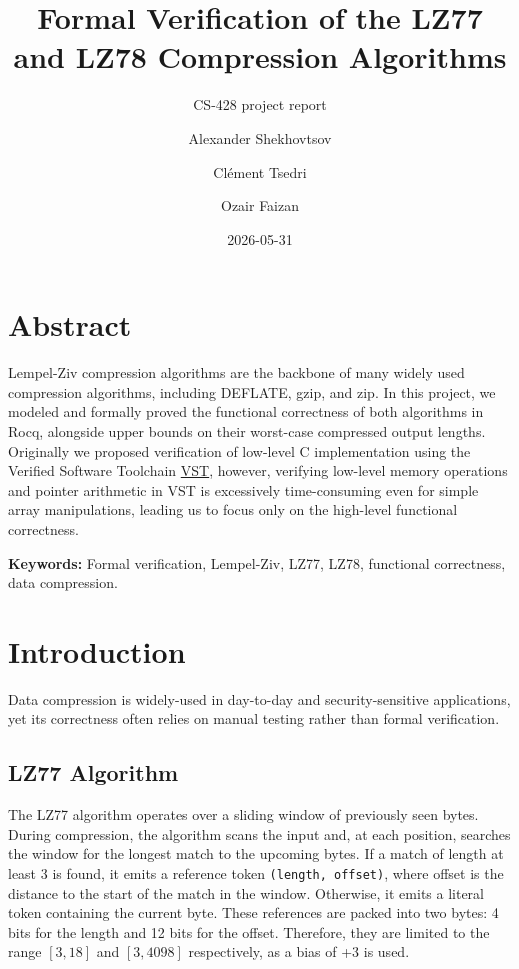 \documentclass[
  a4paper, twocolumn, DIV=calc]{scrartcl}
\title{Formal Verification of the LZ77 and LZ78 Compression Algorithms}
\subtitle{CS-428 project report}
\author{Alexander Shekhovtsov \and Clément Tsedri \and Ozair Faizan}
\date{2026-05-31}
\begin{document}
\maketitle

\section{Abstract}

Lempel-Ziv compression algorithms \cite{ZivLempel1977, ZivLempel1978} are the
backbone of
many widely used compression algorithms, including DEFLATE, gzip, and
zip. In this project, we modeled and formally proved the functional
correctness of both algorithms in Rocq, alongside upper bounds on their
worst-case compressed output lengths. Originally we proposed
verification of low-level C implementation using the Verified Software
Toolchain
\href{https://github.com/PrincetonUniversity/VST}{VST}, however,
verifying low-level memory operations and pointer arithmetic in VST is
excessively time-consuming even for simple array manipulations, leading
us to focus only on the high-level functional correctness.

\textbf{Keywords:} Formal verification, Lempel-Ziv, LZ77, LZ78,
functional correctness, data compression.

\section{Introduction}

Data compression is widely-used in day-to-day and security-sensitive
applications, yet its correctness often relies on manual testing rather
than formal verification.

\subsection{LZ77 Algorithm}

The LZ77 algorithm operates over a sliding window of
previously seen bytes. During compression, the algorithm scans the input
and, at each position, searches the window for the longest match to the
upcoming bytes. If a match of length at least 3 is found, it emits a
reference token \texttt{(length,\ offset)}, where offset is the distance
to the start of the match in the window. Otherwise, it emits a literal
token containing the current byte. These references are packed into two
bytes: 4 bits for the length and 12 bits for the offset. Therefore,
they are limited to the range \([3, 18]\) and \([3, 4098]\)
respectively, as a bias of +3 is used.
\end{document}
